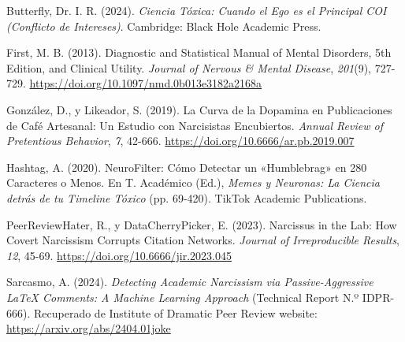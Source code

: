 \documentclass[
  10pt]{article}
\newlength{\cslhangindent}
\newenvironment{CSLReferences}[2] %
 {\begin{list}{}{%
  \setlength{\itemindent}{0pt}
  \setlength{\leftmargin}{0pt}
  \setlength{\parsep}{0pt}
  \ifodd #1
   \setlength{\leftmargin}{\cslhangindent}
   \setlength{\itemindent}{-1\cslhangindent}
  \fi
  \setlength{\itemsep}{#2\baselineskip}}}
 {\end{list}}
\begin{document}
\label{refs}
\begin{CSLReferences}{1}{0}
Butterfly, Dr. I. R. (2024). \emph{Ciencia Tóxica: Cuando el Ego es el
Principal {COI} (Conflicto de Intereses)}. Cambridge: Black Hole
Academic Press.

First, M. B. (2013). Diagnostic and Statistical Manual of Mental
Disorders, 5th Edition, and Clinical Utility. \emph{Journal of Nervous
\& Mental Disease}, \emph{201}(9), 727-729.
\url{https://doi.org/10.1097/nmd.0b013e3182a2168a}

González, D., y Likeador, S. (2019). La Curva de la Dopamina en
Publicaciones de Café Artesanal: Un Estudio con Narcisistas Encubiertos.
\emph{Annual Review of Pretentious Behavior}, \emph{7}, 42-666.
\url{https://doi.org/10.6666/ar.pb.2019.007}

Hashtag, A. (2020). NeuroFilter: Cómo Detectar un {{«Humblebrag»}} en
280 Caracteres o Menos. En T. Académico (Ed.), \emph{Memes y Neuronas:
La Ciencia detrás de tu Timeline Tóxico} (pp. 69-420). TikTok Academic
Publications.

PeerReviewHater, R., y DataCherryPicker, E. (2023). Narcissus in the
Lab: How Covert Narcissism Corrupts Citation Networks. \emph{Journal of
Irreproducible Results}, \emph{12}, 45-69.
\url{https://doi.org/10.6666/jir.2023.045}

Sarcasmo, A. (2024). \emph{Detecting Academic Narcissism via
Passive-Aggressive LaTeX Comments: A Machine Learning Approach}
(Technical Report N.º IDPR-666). Recuperado de Institute of Dramatic
Peer Review website: \url{https://arxiv.org/abs/2404.01joke}

\end{CSLReferences}
\end{document}
